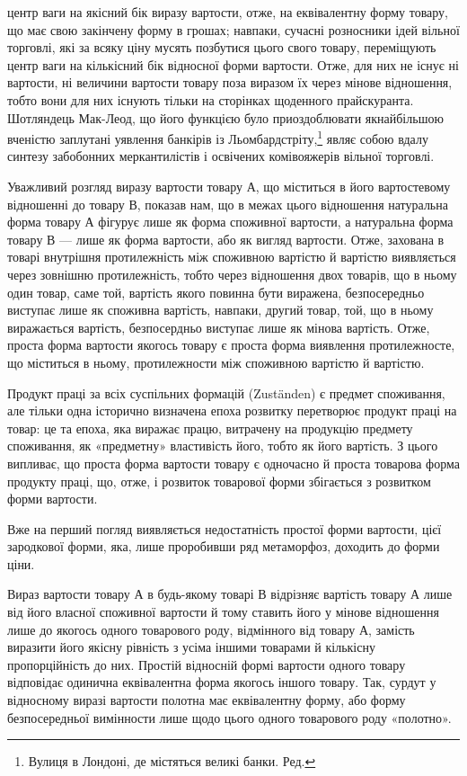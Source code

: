центр ваги на якісний бік виразу вартости, отже, на еквівалентну
форму товару, що має свою закінчену форму в грошах; навпаки,
сучасні розносники ідей вільної торговлі, які за всяку ціну мусять
позбутися цього свого товару, переміщують центр ваги на
кількісний бік відносної форми вартости. Отже, для них не існує
ні вартости, ні величини вартости товару поза виразом їх через
мінове відношення, тобто вони для них існують тільки на сторінках
щоденного прайскуранта. Шотляндець Мак-Леод, що його
функцією було приоздоблювати якнайбільшою вченістю заплутані
уявлення банкірів із Льомбардстріту,\footnote*{
Вулиця в Лондоні, де містяться великі банки. Ред.
} являє собою вдалу синтезу
забобонних меркантилістів і освічених комівояжерів вільної
торговлі.

Уважливий розгляд виразу вартости товару А, що міститься
в його вартостевому відношенні до товару В, показав нам, що
в межах цього відношення натуральна форма товару А фігурує
лише як форма споживної вартости, а натуральна форма товару
В — лише як форма вартости, або як вигляд вартости. Отже,
захована в товарі внутрішня протилежність між споживною вартістю
й вартістю виявляється через зовнішню протилежність, тобто
через відношення двох товарів, що в ньому один товар, саме той,
вартість якого повинна бути виражена, безпосередньо виступає
лише як споживна вартість, навпаки, другий товар, той, що в
ньому виражається вартість, безпосердньо виступає лише як
мінова вартість. Отже, проста форма вартости якогось товару
є проста форма виявлення протилежносте, що міститься в ньому,
протилежности між споживною вартістю й вартістю.

Продукт праці за всіх суспільних формацій (Zuständen) є
предмет споживання, але тільки одна історично визначена епоха
розвитку перетворює продукт праці на товар: це та епоха, яка
виражає працю, витрачену на продукцію предмету споживання,
як «предметну» властивість його, тобто як його вартість. З цього
випливає, що проста форма вартости товару є одночасно й проста
товарова форма продукту праці, що, отже, і розвиток товарової
форми збігається з розвитком форми вартости.

Вже на перший погляд виявляється недостатність простої
форми вартости, цієї зародкової форми, яка, лише проробивши
ряд метаморфоз, доходить до форми ціни.

Вираз вартости товару А в будь-якому товарі В відрізняє
вартість товару А лише від його власної споживної вартости й
тому ставить його у мінове відношення лише до якогось одного
товарового роду, відмінного від товару А, замість виразити його
якісну рівність з усіма іншими товарами й кількісну пропорційність
до них. Простій відносній формі вартости одного товару відповідає
одинична еквівалентна форма якогось іншого товару.
Так, сурдут у відносному виразі вартости полотна має еквівалентну
форму, або форму безпосередньої вимінности лише щодо
цього одного товарового роду «полотно».